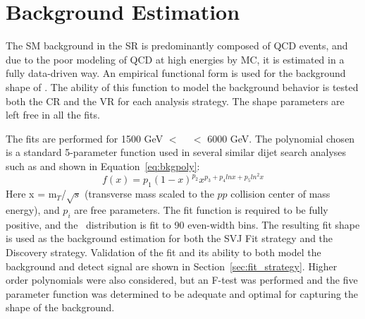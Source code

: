 \section{Background Estimation}
\label{sec:background}


The SM background in the SR is predominantly composed of QCD events, and due to the poor modeling of QCD at high energies by MC, it is estimated in a fully data-driven way. 
An empirical functional form is used for the background shape of \mt.
The ability of this function to model the background behavior is tested both the CR and the VR for each analysis strategy. The shape parameters are left free in all the fits.

The fits are performed for 1500 GeV $<$ \mt~ $<$ 6000 GeV.
The polynomial chosen is a standard 5-parameter function used in several similar dijet search analyses such as \cite{darkjets} \cite{smooth_bkg} \cite{cms_svj} and shown in Equation~\ref{eq:bkgpoly}:
\begin{equation}
f(x) = p_1(1-x)^{p_2}x^{p_3+p_4 lnx+p_5ln^2x}
\label{eq:bkgpoly}
\end{equation}
Here x = m$_{T}$/$\sqrt{s}$ (transverse mass scaled to the $pp$ collision center of mass energy), and $p_i$ are free parameters.
The fit function is required to be fully positive, and the \mt~distribution is fit to 90 even-width bins.
The resulting fit shape is used as the background estimation for both the SVJ Fit strategy and the Discovery strategy. 
Validation of the fit and its ability to both model the background and detect signal are shown in Section~\ref{sec:fit_strategy}.
Higher order polynomials were also considered, but an F-test was performed and the five parameter function was determined to be adequate and optimal for capturing the shape of the background.






